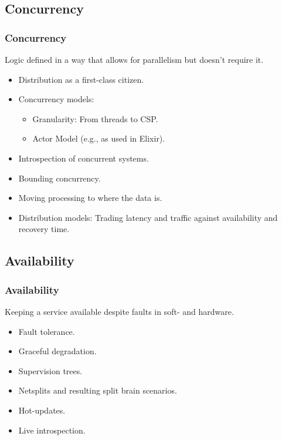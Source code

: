 \subsection{Concurrency}
\begin{frame}
    \frametitle{Concurrency}
    \vspace{3mm}
    Logic defined in a way that allows for parallelism but doesn't require it.
    \vspace{5mm}
    \begin{itemize}
        \item Distribution as a first-class citizen.
        \item Concurrency models:
          \begin{itemize}
            \item Granularity: From threads to CSP.
            \item Actor Model (e.g., as used in Elixir).
          \end{itemize}
        \item Introspection of concurrent systems.
        \item Bounding concurrency.
        \item Moving processing to where the data is.
        \item Distribution models: Trading latency and traffic against availability and recovery time.
    \end{itemize}
\end{frame}

\subsection{Availability}
\begin{frame}
    \frametitle{Availability}
    \vspace{3mm}
    Keeping a service available despite faults in soft- and hardware. 
    \vspace{5mm}
    \begin{itemize}
        \item Fault tolerance.
        \item Graceful degradation.
        \item Supervision trees.
        \item Netsplits and resulting split brain scenarios.
        \item Hot-updates.
        \item Live introspection.
    \end{itemize}
\end{frame}

